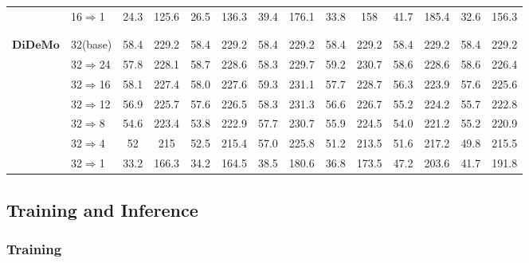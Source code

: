 \documentclass[11pt]{article}
\begin{document}
\begin{table*}[htbp]
\begin{center}
{\begin{tabular}{ll|cc|cc|cc|cc|cc|cc}
        &16$\Rightarrow$1        & 24.3    & 125.6 & 26.5   & 136.3 & 39.4 & 176.1 & 33.8 & 158   & \cellcolor{gray!20}41.7 & \cellcolor{gray!20}185.4 & 32.6 & 156.3\\
\\[-9pt]
\hline
\\[-9pt]
 \multirow{7}{*}[-1ex]{$\textbf{DiDeMo}$} &32(base) & 58.4  & 229.2 & 58.4  & 229.2 & 58.4  & 229.2  & 58.4  & 229.2  & 58.4  & 229.2 & 58.4  & 229.2 \\
       &32$\Rightarrow$24       & 57.8    & 228.1 & 58.7   & 228.6 & 58.3 & 229.7 & \cellcolor{gray!20}59.2 & \cellcolor{gray!20}230.7 & 58.6 & 228.6 & 58.6 & 226.4\\
        &32$\Rightarrow$16       & 58.1    & 227.4 & 58.0   & 227.6 & \cellcolor{gray!20}59.3 & \cellcolor{gray!20}231.1 & 57.7 & 228.7 & 56.3 & 223.9 & 57.6 & 225.6\\
        &32$\Rightarrow$12       & 56.9    & 225.7 & 57.6   & 226.5 & \cellcolor{gray!20}58.3 & \cellcolor{gray!20}231.3 & 56.6 & 226.7 & 55.2 & 224.2 & 55.7 & 222.8\\
        &32$\Rightarrow$8        & 54.6    & 223.4 & 53.8   & 222.9 & \cellcolor{gray!20}57.7 & \cellcolor{gray!20}230.7 & 55.9 & 224.5 & 54.0 & 221.2 & 55.2 & 220.9\\
        &32$\Rightarrow$4        & 52      & 215   & 52.5   & 215.4 & \cellcolor{gray!20}57.0 & \cellcolor{gray!20}225.8 & 51.2 & 213.5 & 51.6 & 217.2 & 49.8 & 215.5\\
        &32$\Rightarrow$1        & 33.2    & 166.3 & 34.2   & 164.5 & 38.5 & 180.6 & 36.8 & 173.5 & \cellcolor{gray!20}47.2 & \cellcolor{gray!20}203.6 & 41.7 & 191.8 \\
\bottomrule[1pt]
\end{tabular}}
\end{center}
\vspace{-0.3cm}
\end{table*}

\subsection{Training and Inference}
\subsubsection{Training}
\label{loss}
\end{document}

